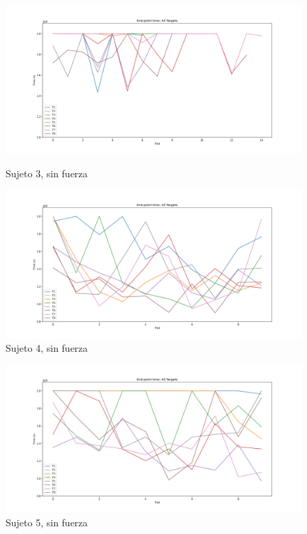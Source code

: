 \documentclass[a4paper,11pt, oneside]{book}
\begin{document}
\begin{figure}[h]
	\begin{minipage}[b]{0.5\linewidth}
		\centering
		\includegraphics[width=\linewidth]{sujeto3/no_force/evolution_time}
		\caption{Sujeto 3, sin fuerza}
		\label{fig:figura1}
	\end{minipage}
	\hspace{0.5cm}
	\begin{minipage}[b]{0.5\linewidth}
		\centering
		\includegraphics[width=\linewidth]{sujeto4/no_force/evolution_time}
		\caption{Sujeto 4, sin fuerza}
		\label{fig:figura2}
	\end{minipage}
\end{figure}
\begin{figure}[h]
	\begin{minipage}[b]{0.5\linewidth}
		\centering
		\includegraphics[width=\linewidth]{sujeto5/no_force/evolution_time}
		\caption{Sujeto 5, sin fuerza}
		\label{fig:figura1}
	\end{minipage}
\end{figure}
\end{document}
